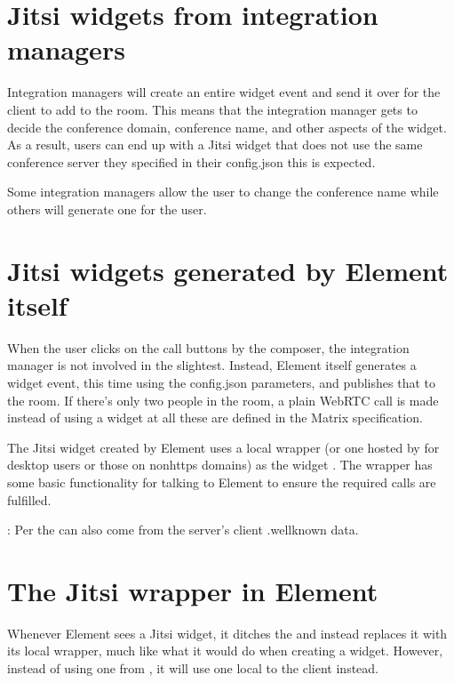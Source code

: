 \documentclass[letterpaper,10pt,openany,oneside,english]{sphinxmanual}
\begin{document}
\chapter{Jitsi widgets from integration managers}
\label{\detokenize{jitsi-dev:jitsi-widgets-from-integration-managers}}
\sphinxAtStartPar
Integration managers will create an entire widget event and send it over 
for the client to add to the room. This means that the integration manager gets to
decide the conference domain, conference name, and other aspects of the widget. As
a result, users can end up with a Jitsi widget that does not use the same conference
server they specified in their config.json \sphinxhyphen{} this is expected.

\sphinxAtStartPar
Some integration managers allow the user to change the conference name while others
will generate one for the user.


\chapter{Jitsi widgets generated by Element itself}
\label{\detokenize{jitsi-dev:jitsi-widgets-generated-by-element-itself}}
\sphinxAtStartPar
When the user clicks on the call buttons by the composer, the integration manager is
not involved in the slightest. Instead, Element itself generates a widget event, this time
using the config.json parameters, and publishes that to the room. If there’s only two
people in the room, a plain WebRTC call is made instead of using a widget at all \sphinxhyphen{} these
are defined in the Matrix specification.

\sphinxAtStartPar
The Jitsi widget created by Element uses a local  wrapper (or one hosted by
 for desktop users or those on non\sphinxhyphen{}https domains) as the widget
. The wrapper has some basic functionality for talking to Element to ensure the
required  calls are fulfilled.

\sphinxAtStartPar
{}: Per  the  can also come from the server’s
client .well\sphinxhyphen{}known data.


\chapter{The Jitsi wrapper in Element}
\label{\detokenize{jitsi-dev:the-jitsi-wrapper-in-element}}
\sphinxAtStartPar
Whenever Element sees a Jitsi widget, it ditches the  and instead replaces it with
its local wrapper, much like what it would do when creating a widget. However, instead
of using one from , it will use one local to the client instead.
\end{document}
